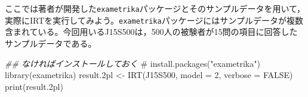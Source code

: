 \documentclass[
  a4paper,
]{ltjsbook}
\newenvironment{Shaded}{\begin{snugshade}}{\end{snugshade}}
\newcommand{\AttributeTok}[1]{\textcolor[rgb]{0.40,0.45,0.13}{#1}}
\newcommand{\CommentTok}[1]{\textcolor[rgb]{0.37,0.37,0.37}{#1}}
\newcommand{\ConstantTok}[1]{\textcolor[rgb]{0.56,0.35,0.01}{#1}}
\newcommand{\DecValTok}[1]{\textcolor[rgb]{0.68,0.00,0.00}{#1}}
\newcommand{\DocumentationTok}[1]{\textcolor[rgb]{0.37,0.37,0.37}{\textit{#1}}}
\newcommand{\FloatTok}[1]{\textcolor[rgb]{0.68,0.00,0.00}{#1}}
\newcommand{\FunctionTok}[1]{\textcolor[rgb]{0.28,0.35,0.67}{#1}}
\newcommand{\NormalTok}[1]{\textcolor[rgb]{0.00,0.23,0.31}{#1}}
\newcommand{\OtherTok}[1]{\textcolor[rgb]{0.00,0.23,0.31}{#1}}
\begin{document}
ここでは著者が開発した\texttt{exametrika}パッケージとそのサンプルデータを用いて，実際にIRTを実行してみよう。\texttt{exametrika}パッケージにはサンプルデータが複数含まれている。今回用いるJ15S500は，500人の被験者が15問の項目に回答したサンプルデータである。

\begin{Shaded}
\begin{Highlighting}[]
\DocumentationTok{\#\# なければインストールしておく}
\CommentTok{\# install.packages("exametrika")}
\FunctionTok{library}\NormalTok{(exametrika)}
\NormalTok{result}\FloatTok{.2}\NormalTok{pl }\OtherTok{\textless{}{-}} \FunctionTok{IRT}\NormalTok{(J15S500, }\AttributeTok{model =} \DecValTok{2}\NormalTok{, }\AttributeTok{verbose =} \ConstantTok{FALSE}\NormalTok{)}
\FunctionTok{print}\NormalTok{(result}\FloatTok{.2}\NormalTok{pl)}
\end{Highlighting}
\end{Shaded}
\end{document}
